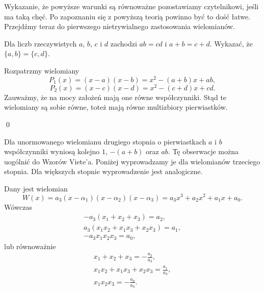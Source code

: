\vspace{5px}
\noindent
Wykazanie, że powyższe warunki są równoważne pozostawiamy czytelnikowi, jeśli ma taką chęć. Po zapoznaniu się z powyższą teorią powinno być to dość łatwe. Przejdźmy teraz do pierwszego nietrywialnego zastosowania wielomianów.

\vspace{5px}


\noindent
Dla liczb rzeczywistych $a$, $b$, $c$ i $d$ zachodzi $ab = cd$ i $a + b = c + d$. Wykazać, że $\{a, b\} = \{c, d\}$.

\vspace{5px}


\noindent
Rozpatrzmy wielomiany
\[
    P_1(x) = (x - a)(x - b) = x^2 - (a + b)x + ab,
\]
\[
    P_2(x) = (x - c)(x - d) = x^2 - (c + d)x + cd.
\]
Zauważmy, że na mocy założeń mają one równe współczynniki. Stąd te wielomiany są sobie równe, toteż mają równe multizbiory pierwiastków.

\qed

\vspace{5px}

\noindent
Dla unormowanego wielomianu drugiego stopnia o pierwiastkach $a$ i $b$ współczynniki wyniosą kolejno $1$, $-(a + b)$ oraz $ab$. Tę obserwacje można uogólnić do Wzorów Viete'a. Poniżej wyprowadzamy je dla wielomianów trzeciego stopnia. Dla większych stopnie wyprowadzenie jest analogiczne. 

\newpage


\noindent
Dany jest wielomian
\[
     W(x) = a_3(x - \alpha_1)(x - \alpha_2)(x - \alpha_3) = a_3x^3 + a_2x^2 + a_1x + a_0.
\]
Wówczas 
\begin{align*}
-a_3(x_1 + x_2 + x_3) = a_2, \\
a_3(x_1x_2 + x_1x_3 + x_2x_3) = a_1, \\
-a_3x_1x_2x_3 = a_0,
\end{align*}
lub równoważnie
\begin{align*}
x_1 + x_2 + x_3 = -\frac{a_2}{a_3}, \\
x_1x_2 + x_1x_3 + x_2x_3 = \frac{a_1}{a_3}, \\
x_1x_2x_3 = -\frac{a_0}{a_3}.
\end{align*}
